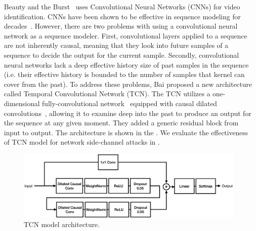 
Beauty and the Burst~\cite{schuster2017beautyburst} uses Convolutional Neural Networks (CNNs) for video identification. 
CNNs have been shown to be effective in sequence modeling for decades~\cite{hinton1990connectionist}.
However, there are two problems with using a convolutional neural network as a sequence modeler.
First, convolutional layers applied to a sequence are not inherently causal, meaning that they look into future samples of a sequence to decide the output for the current sample.
Secondly, convolutional neural networks lack a deep effective history size of past samples in the sequence (i.e. their effective history is bounded to the number of samples that kernel can cover from the past).
To address these problems, Bai proposed a new architecture called Temporal Convolutional Network (TCN).
The TCN utilizes a one-dimensional fully-convolutional network~\cite{long2015fully} equipped with causal dilated convolutions~\cite{oord2016wavenet}, allowing it to examine deep into the past to produce an output for the sequence at any given moment.
They added a generic residual block from input to output.
The architecture is shown in the .
We evaluate the effectiveness of TCN model for network side-channel attacks in .



\begin{figure}[t]
  \centering
  \includegraphics[width=\columnwidth]{figures/TCN_arch.pdf}
  \caption{TCN model architecture.}
  \label{fig:tcn-arch}
\end{figure}

